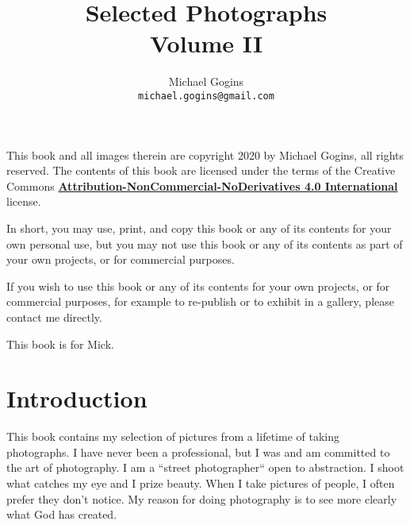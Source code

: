 \documentclass[10pt,letter,oneside]{scrbook}
\begin{document}
	\frontmatter
	\onecolumn
	
	\title{Selected Photographs \\ Volume II}
	\author{Michael Gogins \\ \texttt{michael.gogins@gmail.com}}
	
	\maketitle
	
	\clearpage
	\noindent This book and all images therein are copyright 2020 by Michael Gogins, all rights reserved. The contents of this book are licensed under the terms of the Creative Commons \href{https://creativecommons.org/licenses/by-nc-nd/4.0/legalcode}{\textbf{Attribution-NonCommercial-NoDerivatives 4.0 International} } license. 
	
	In short, you may use, print, and copy this book or any of its contents for your own personal use, but you may not use this book or any of its contents as part of your own projects, or for commercial purposes.
	
	If you wish to use this book or any of its contents for your own projects, or for commercial purposes, for example to re-publish or to exhibit in a gallery, please contact me directly.
	
	\clearpage
	\begin{centering}
	This book is for Mick.
	\end{centering}
	
	\tableofcontents
	\listoffigures
	
	\mainmatter
	
	\pagestyle{headings}
	\twocolumn
	\chapter{Introduction}
	
	This book contains my selection of pictures from a lifetime of taking photographs. I have never been a professional, but I was and am committed to the art of photography. I am a ``street photographer`` open to abstraction. I shoot what catches my eye and I prize beauty. When I take pictures of people, I often prefer they don't notice. My reason for doing photography is to see more clearly what God has created.
	
\end{document}
